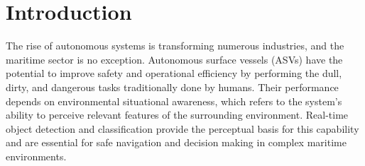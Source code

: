 \documentclass{erauthesis}
\begin{document}
\begin{abstract}
 This research addresses the critical gap in quantitative performance comparison between \ac{LiDAR} and vision-based sensing for real-time maritime object detection on autonomous surface vessels.
 Using \ac{ERAU}'s Minion platform and 2024 Maritime RobotX Challenge data, this study evaluates \ac{GB-CACHE} \ac{LiDAR} processing against \ac{YOLO} vision detection across six maritime object categories. The methodology encompasses real-time performance analysis, multi-sensor calibration, and sensor fusion for integrating bounding box confidence.
 Performance metrics include precision, recall, \ac{mAP}, training requirements, and computational efficiency. 
 The research provides quantitative baselines for maritime sensing modality selection and validated calibration procedures enabling improved autonomous navigation in complex maritime environments.


\end{abstract}
\pagetableofcontents
\clearpage
\listoftables					%
\clearpage
\listoffigures					%




\mainmatter
\newpage
\chapter{Introduction} \label{introduction}
The rise of autonomous systems is transforming numerous industries, and the maritime sector is no exception. Autonomous surface vessels (ASVs) have the potential to improve safety and operational efficiency by performing the dull, dirty, and dangerous tasks traditionally done by humans.
Their performance depends on environmental situational awareness, which refers to the system’s ability to perceive relevant features of the surrounding environment. 
Real-time object detection and classification provide the perceptual basis for this capability and are essential for safe navigation and decision making in complex maritime environments.
\end{document}
